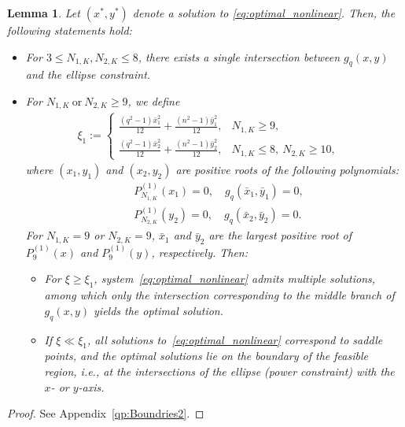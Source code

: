 \documentclass[journal,12pt,onecolumn,draftclsnofoot]{IEEEtran}
\newtheorem{lem}{Lemma}
\theoremstyle{definition}
\begin{document}
\begin{lem}\label{lem:Boundries2}
     Let $(x^*,y^*)$ denote a solution to \eqref{eq:optimal_nonlinear}. Then, the following statements hold:
    \begin{itemize}
        \item For $3 \leq N_{1,K}, N_{2,K} \leq 8$, there exists a single intersection between $g_q(x,y)$ and the ellipse constraint. 
        \item For $N_{1,K}~\text{or}~N_{2,K}\geq 9$, we define 
    \begin{align}
    \label{eq:r1r2def2}
    \xi_1 := \begin{cases}  \frac{(q^2-1)\bar{x}_1^2}{12} + \frac{(n^2-1)\bar{y}_1^2}{12},&  N_{1, K}\geq 9, \\
        \frac{(q^2-1)\bar{x}_2^2}{12} + \frac{(n^2-1)\bar{y}_2^2}{12}, &  N_{1, K}\leq 8,~N_{2, K}\geq 10,
    \end{cases} \quad 
    \end{align}
    where $(x_1, y_1)$ and $(x_2, y_2)$ are positive roots of the following polynomials: 
\begin{subequations}
    \begin{align}
      & P_{N_{1,K}}^{(1)}(x_1) = 0,  \quad g_q(\bar{x}_1, \bar{y}_1) = 0, \\ 
      & P_{N_{2,K}}^{(1)}(y_2) = 0,  \quad g_q(\bar{x}_2, \bar{y}_2) = 0. 
\end{align}
\end{subequations}
                For $N_{1,K} = 9$ or $N_{2,K} = 9$, $\bar{x}_1$ and $\bar{y}_2$ are the largest positive root of $P^{(1)}_{9}(x)$ and $P^{(1)}_{9}(y)$, respectively. Then:
        \begin{itemize}
            \item For $\xi \geq \xi_1$, system~\eqref{eq:optimal_nonlinear} admits multiple solutions, among which only the intersection corresponding to the middle branch of $g_q(x,y)$ yields the optimal solution.
            \item If $\xi \ll \xi_1$, all solutions to~\eqref{eq:optimal_nonlinear} correspond to saddle points, and the optimal solutions lie on the boundary of the feasible region, i.e., at the intersections of the ellipse (power constraint) with the $x$- or $y$-axis.
        \end{itemize}
    \end{itemize}
\end{lem}
\begin{proof}
 See Appendix~\ref{qp:Boundries2}. 
\end{proof}
\end{document}
